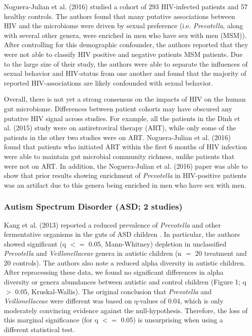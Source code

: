 Noguera-Julian et al. (2016) studied a cohort of 293 HIV-infected patients and 57 healthy controls.
The authors found that many putative associations between HIV and the microbiome were driven by sexual preference (i.e. \textit{Prevotella}, along with several other genera, were enriched in men who have sex with men (MSM)).
After controlling for this demographic confounder, the authors reported that they were not able to classify HIV positive and negative patients MSM patients.
Due to the large size of their study, the authors were able to separate the influences of sexual behavior and HIV-status from one another and found that the majority of reported HIV-associations are likely confounded with sexual behavior.

Overall, there is not yet a strong consensus on the impacts of HIV on the human gut microbiome.
Differences between patient cohorts may have obscured any putative HIV signal across studies.
For example, all the patients in the Dinh et al. (2015) study were on antiretroviral therapy (ART), while only some of the patients in the other two studies were on ART.
Noguera-Julian et al. (2016) found that patients who initiated ART within the first 6 months of HIV infection were able to maintain gut microbial community richness, unlike patients that were not on ART.
In addition, the Noguera-Julian et al. (2016) paper was able to show that prior results showing enrichment of \textit{Prevotella} in HIV-positive patients was an artifact due to this genera being enriched in men who have sex with men.

\subsubsection{Autism Spectrum Disorder (ASD; 2 studies)}

Kang et al. (2013) reported a reduced prevalence of \textit{Prevotella} and other fermentative organisms in the guts of ASD children \cite{asd-kb}.
In particular, the authors showed significant (q $<=$ 0.05, Mann-Whitney) depletion in unclassified \textit{Prevotella} and \textit{Veillonellaceae} genera in autistic children (n $=$ 20 treatment and 20 controls).
The authors also note a reduced alpha diversity in autistic children.
After reprocessing these data, we found no significant differences in alpha diversity or genera abundances between autistic and control children (Figure 1; q $>$ 0.05, Kruskal-Wallis).
The original conclusion that \textit{Prevotella} and \textit{Veillonellaceae} were different was based on q-values of 0.04, which is only moderately convincing evidence against the null-hypothesis.
Therefore, the loss of this marginal significance (for q $<=$ 0.05) is unsurprising when using a different statistical test.

